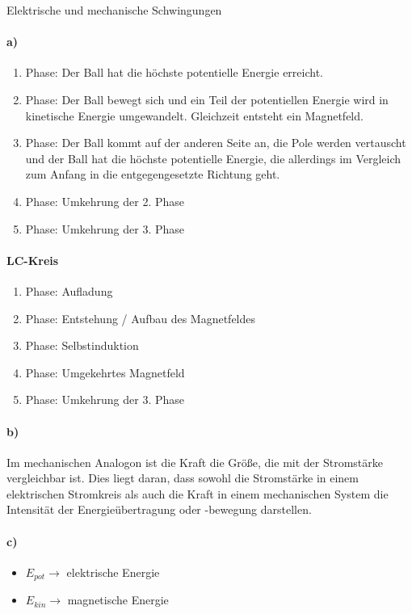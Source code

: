 \documentclass[12pt,a4paper]{report}
\begin{document}
	\noindent
	\Large
	Elektrische und mechanische Schwingungen
	\large
	\noindent
	\paragraph{a)}
	\begin{enumerate}
		\item Phase: Der Ball hat die höchste potentielle Energie erreicht.
		\item Phase: Der Ball bewegt sich und ein Teil der potentiellen Energie wird in kinetische Energie umgewandelt. Gleichzeit entsteht ein Magnetfeld.
		\item Phase: Der Ball kommt auf der anderen Seite an, die Pole werden vertauscht und der Ball hat die höchste potentielle Energie, die allerdings im Vergleich zum Anfang in die entgegengesetzte Richtung geht.
		\item Phase: Umkehrung der 2. Phase
		\item Phase: Umkehrung der 3. Phase
	\end{enumerate}
	\paragraph{LC-Kreis}
	\begin{enumerate}
		\item Phase: Aufladung
		\item Phase: Entstehung / Aufbau des Magnetfeldes
		\item Phase: Selbstinduktion
		\item Phase: Umgekehrtes Magnetfeld
		\item Phase: Umkehrung der 3. Phase
	\end{enumerate}
	\paragraph{b)}
	Im mechanischen Analogon ist die Kraft die Größe, die mit der Stromstärke vergleichbar ist.
	Dies liegt daran, dass sowohl die Stromstärke in einem elektrischen Stromkreis als auch die Kraft in einem mechanischen System die Intensität der Energieübertragung oder -bewegung darstellen.
	\paragraph{c)}
	\begin{itemize}
		\item $E_{pot} \to$ 	elektrische Energie
		\item $E_{kin} \to$ magnetische Energie 
	\end{itemize}
\end{document}
